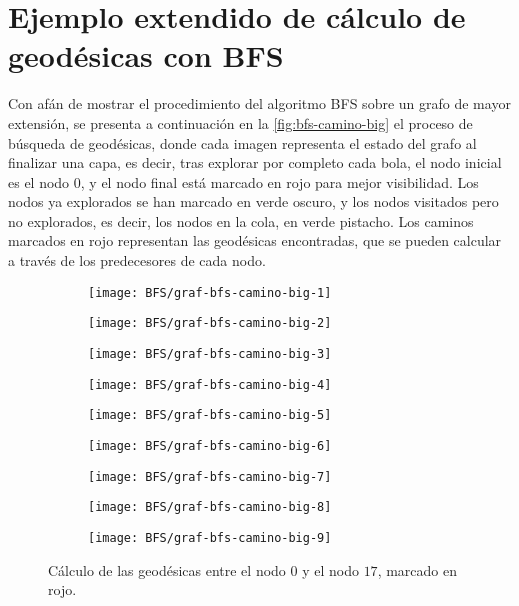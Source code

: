 
\chapter{Ejemplo extendido de cálculo de geodésicas con BFS}\label{ap:apendice1}

Con afán de mostrar el procedimiento del algoritmo BFS sobre un grafo de mayor extensión, se presenta a continuación en la \autoref{fig:bfs-camino-big} el proceso de búsqueda de geodésicas, donde cada imagen representa el estado del grafo al finalizar una capa, es decir, tras explorar por completo cada bola, el nodo inicial es el nodo $0$, y el nodo final está marcado en rojo para mejor visibilidad. Los nodos ya explorados se han marcado en verde oscuro, y los nodos visitados pero no explorados, es decir, los nodos en la cola, en verde pistacho. Los caminos marcados en rojo representan las geodésicas encontradas, que se pueden calcular a través de los predecesores de cada nodo.

\begin{figure}[htb]
	\centering
	\begin{subfigure}{0.28\linewidth}
		\texttt{[image: BFS/graf-bfs-camino-big-1]}
		\caption{}
	\end{subfigure}
	\begin{subfigure}{0.28\linewidth}
		\texttt{[image: BFS/graf-bfs-camino-big-2]}
		\caption{}
	\end{subfigure}
	\begin{subfigure}{0.28\linewidth}
		\texttt{[image: BFS/graf-bfs-camino-big-3]}
		\caption{}
	\end{subfigure}
	\begin{subfigure}{0.28\linewidth}
		\texttt{[image: BFS/graf-bfs-camino-big-4]}
		\caption{}
	\end{subfigure}
	\begin{subfigure}{0.28\linewidth}
		\texttt{[image: BFS/graf-bfs-camino-big-5]}
		\caption{}
	\end{subfigure}
	\begin{subfigure}{0.28\linewidth}
		\texttt{[image: BFS/graf-bfs-camino-big-6]}
		\caption{}
	\end{subfigure}
	\begin{subfigure}{0.28\linewidth}
		\texttt{[image: BFS/graf-bfs-camino-big-7]}
		\caption{}
	\end{subfigure}
	\begin{subfigure}{0.28\linewidth}
		\texttt{[image: BFS/graf-bfs-camino-big-8]}
		\caption{}
	\end{subfigure}
	\begin{subfigure}{0.28\linewidth}
		\texttt{[image: BFS/graf-bfs-camino-big-9]}
		\caption{}
	\end{subfigure}
	\caption{Cálculo de las geodésicas entre el nodo $0$ y el nodo $17$, marcado en rojo.}
	\label{fig:bfs-camino-big}
\end{figure}


\endinput
